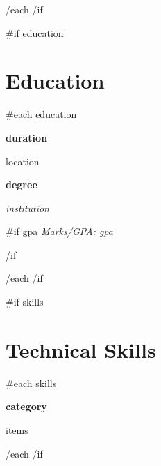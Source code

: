 \documentclass[11pt, a4paper]{article}
\newcommand{\timelineSimple}[4]{
    \noindent
    \begin{minipage}[t]{0.18\textwidth}
        \vspace{0pt}
        \textcolor{secondary}{\small\textbf{#1}}\par
        \vspace{2pt}
        \textcolor{secondary}{\footnotesize #2}
    \end{minipage}%
    \hfill
    \begin{minipage}[t]{0.79\textwidth}
        \vspace{0pt}
        \textbf{\large\color{primary}#3}\par
        \vspace{2pt}
        \textit{\color{secondary}#4}
    \end{minipage}
    \par\vspace{10pt}
}
\begin{document}
{{/each}}
{{/if}}

{{#if education}}
\section*{Education}

{{#each education}}
\timelineSimple{ {{{duration}}} }{ {{{location}}} }
{ {{{degree}}} }{ {{{institution}}} }
{{#if gpa}}
\noindent\hspace{0.21\textwidth}\small{\textit{Marks/GPA: {{{gpa}}} }}\par\vspace{4pt}
{{/if}}

{{/each}}
{{/if}}

{{#if skills}}
\section*{Technical Skills}
{{#each skills}}
\noindent
\begin{minipage}[t]{0.18\textwidth}
    \vspace{0pt}
    \textcolor{secondary}{\small\textbf{ {{{category}}} }}
\end{minipage}%
\hfill
\begin{minipage}[t]{0.79\textwidth}
    \vspace{0pt}
    {{{items}}}
\end{minipage}
\par\vspace{8pt}

{{/each}}
{{/if}}
\end{document}
